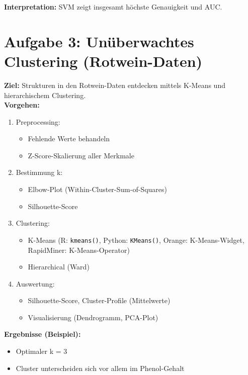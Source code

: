 \documentclass[a4paper,12pt]{article}
\begin{document}
\textbf{Interpretation:} SVM zeigt insgesamt höchste Genauigkeit und AUC.

\newpage

\section*{Aufgabe 3: Unüberwachtes Clustering (Rotwein-Daten)}

\textbf{Ziel:} Strukturen in den Rotwein-Daten entdecken mittels K-Means und hierarchischem Clustering.\\

\textbf{Vorgehen:}
\begin{enumerate}
  \item Preprocessing:
    \begin{itemize}
      \item Fehlende Werte behandeln
      \item Z-Score-Skalierung aller Merkmale
    \end{itemize}
  \item Bestimmung k:
    \begin{itemize}
      \item Elbow-Plot (Within-Cluster-Sum-of-Squares)
      \item Silhouette-Score
    \end{itemize}
  \item Clustering:
    \begin{itemize}
      \item K-Means (R: \lstinline|kmeans()|, Python: \lstinline|KMeans()|, Orange: K-Means-Widget, RapidMiner: K-Means-Operator)
      \item Hierarchical (Ward)
    \end{itemize}
  \item Auswertung:
    \begin{itemize}
      \item Silhouette-Score, Cluster-Profile (Mittelwerte)
      \item Visualisierung (Dendrogramm, PCA-Plot)
    \end{itemize}
\end{enumerate}

\textbf{Ergebnisse (Beispiel):}
\begin{itemize}
  \item Optimaler k = 3
  \item Cluster unterscheiden sich vor allem im Phenol-Gehalt
\end{itemize}
\end{document}
